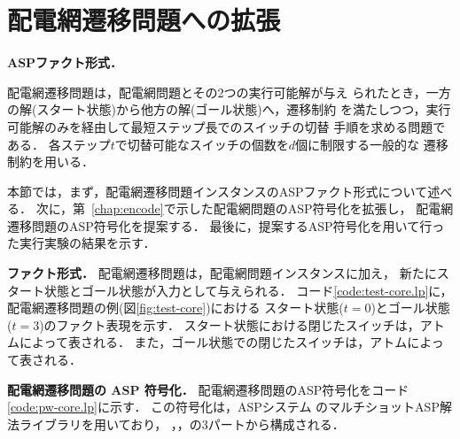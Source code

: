\section{配電網遷移問題への拡張}\label{chap:core}

\textbf{ASPファクト形式．}



配電網遷移問題は，配電網問題とその2つの実行可能解が与え
られたとき，一方の解(スタート状態)から他方の解(ゴール状態)へ，遷移制約
を満たしつつ，実行可能解のみを経由して最短ステップ長でのスイッチの切替
手順を求める問題である．
各ステップ$t$で切替可能なスイッチの個数を$d$個に制限する一般的な
遷移制約を用いる．

本節では，まず，配電網遷移問題インスタンスのASPファクト形式について述べる．
次に，第~\ref{chap:encode}で示した配電網問題のASP符号化を拡張し，
配電網遷移問題のASP符号化を提案する．
最後に，提案するASP符号化を用いて行った実行実験の結果を示す．

\textbf{ファクト形式．}
配電網遷移問題は，配電網問題インスタンスに加え，
新たにスタート状態とゴール状態が入力として与えられる．
コード\ref{code:test-core.lp}に，
配電網遷移問題の例(図\ref{fig:test-core})における
スタート状態($t=0$)とゴール状態($t=3$)のファクト表現を示す．
スタート状態における閉じたスイッチは，アトムによって表される．
また，ゴール状態での閉じたスイッチは，アトムによって表される．

\textbf{配電網遷移問題の ASP 符号化．}
%
配電網遷移問題のASP符号化をコード\ref{code:pw-core.lp}に示す．
この符号化は，ASPシステム \clingo のマルチショットASP解法ライブラリを用いており，
，，の3パートから構成される．

